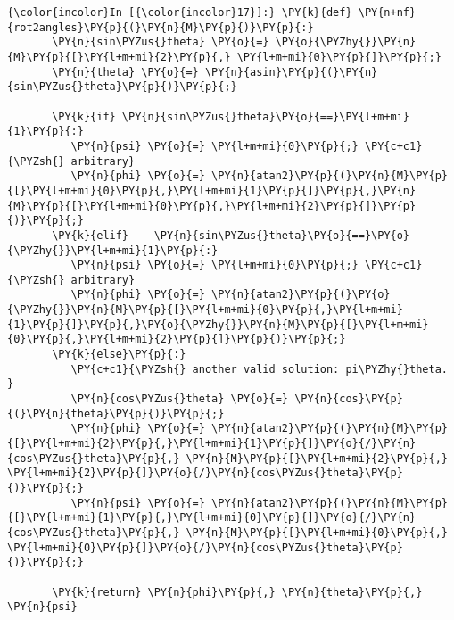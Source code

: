 \documentclass[a4paper]{scrreprt}
\begin{document}
\begin{Verbatim}[commandchars=\\\{\}]
{\color{incolor}In [{\color{incolor}17}]:} \PY{k}{def} \PY{n+nf}{rot2angles}\PY{p}{(}\PY{n}{M}\PY{p}{)}\PY{p}{:}
	   \PY{n}{sin\PYZus{}theta} \PY{o}{=} \PY{o}{\PYZhy{}}\PY{n}{M}\PY{p}{[}\PY{l+m+mi}{2}\PY{p}{,} \PY{l+m+mi}{0}\PY{p}{]}\PY{p}{;}     
	   \PY{n}{theta} \PY{o}{=} \PY{n}{asin}\PY{p}{(}\PY{n}{sin\PYZus{}theta}\PY{p}{)}\PY{p}{;}     

	   \PY{k}{if} \PY{n}{sin\PYZus{}theta}\PY{o}{==}\PY{l+m+mi}{1}\PY{p}{:}
	      \PY{n}{psi} \PY{o}{=} \PY{l+m+mi}{0}\PY{p}{;} \PY{c+c1}{\PYZsh{} arbitrary}
	      \PY{n}{phi} \PY{o}{=} \PY{n}{atan2}\PY{p}{(}\PY{n}{M}\PY{p}{[}\PY{l+m+mi}{0}\PY{p}{,}\PY{l+m+mi}{1}\PY{p}{]}\PY{p}{,}\PY{n}{M}\PY{p}{[}\PY{l+m+mi}{0}\PY{p}{,}\PY{l+m+mi}{2}\PY{p}{]}\PY{p}{)}\PY{p}{;}     
	   \PY{k}{elif}    \PY{n}{sin\PYZus{}theta}\PY{o}{==}\PY{o}{\PYZhy{}}\PY{l+m+mi}{1}\PY{p}{:}
	      \PY{n}{psi} \PY{o}{=} \PY{l+m+mi}{0}\PY{p}{;} \PY{c+c1}{\PYZsh{} arbitrary}
	      \PY{n}{phi} \PY{o}{=} \PY{n}{atan2}\PY{p}{(}\PY{o}{\PYZhy{}}\PY{n}{M}\PY{p}{[}\PY{l+m+mi}{0}\PY{p}{,}\PY{l+m+mi}{1}\PY{p}{]}\PY{p}{,}\PY{o}{\PYZhy{}}\PY{n}{M}\PY{p}{[}\PY{l+m+mi}{0}\PY{p}{,}\PY{l+m+mi}{2}\PY{p}{]}\PY{p}{)}\PY{p}{;}        
	   \PY{k}{else}\PY{p}{:}
	      \PY{c+c1}{\PYZsh{} another valid solution: pi\PYZhy{}theta.             }
	      \PY{n}{cos\PYZus{}theta} \PY{o}{=} \PY{n}{cos}\PY{p}{(}\PY{n}{theta}\PY{p}{)}\PY{p}{;} 
	      \PY{n}{phi} \PY{o}{=} \PY{n}{atan2}\PY{p}{(}\PY{n}{M}\PY{p}{[}\PY{l+m+mi}{2}\PY{p}{,}\PY{l+m+mi}{1}\PY{p}{]}\PY{o}{/}\PY{n}{cos\PYZus{}theta}\PY{p}{,} \PY{n}{M}\PY{p}{[}\PY{l+m+mi}{2}\PY{p}{,} \PY{l+m+mi}{2}\PY{p}{]}\PY{o}{/}\PY{n}{cos\PYZus{}theta}\PY{p}{)}\PY{p}{;}
	      \PY{n}{psi} \PY{o}{=} \PY{n}{atan2}\PY{p}{(}\PY{n}{M}\PY{p}{[}\PY{l+m+mi}{1}\PY{p}{,}\PY{l+m+mi}{0}\PY{p}{]}\PY{o}{/}\PY{n}{cos\PYZus{}theta}\PY{p}{,} \PY{n}{M}\PY{p}{[}\PY{l+m+mi}{0}\PY{p}{,} \PY{l+m+mi}{0}\PY{p}{]}\PY{o}{/}\PY{n}{cos\PYZus{}theta}\PY{p}{)}\PY{p}{;}

	   \PY{k}{return} \PY{n}{phi}\PY{p}{,} \PY{n}{theta}\PY{p}{,} \PY{n}{psi}
\end{Verbatim}


\subsection{}\label{d}
\end{document}
